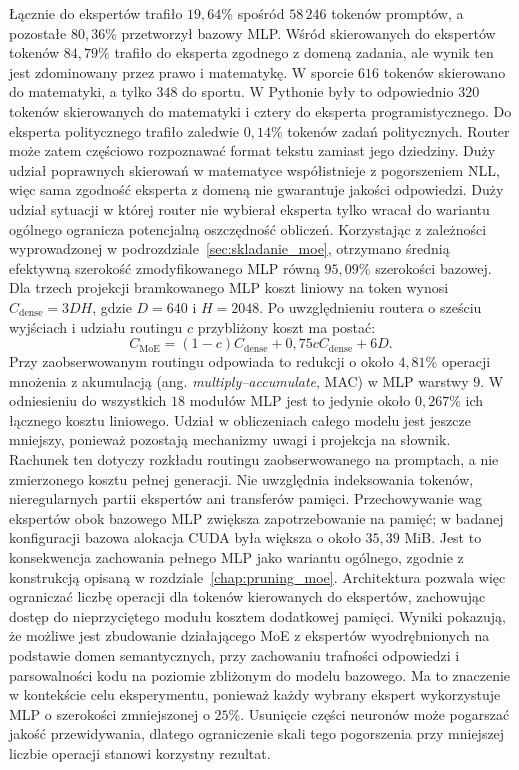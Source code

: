 Łącznie do ekspertów trafiło $19{,}64\%$ spośród $58\,246$ tokenów promptów, a pozostałe $80{,}36\%$ przetworzył bazowy MLP. Wśród skierowanych do ekspertów tokenów $84{,}79\%$ trafiło do eksperta zgodnego z domeną zadania, ale wynik ten jest zdominowany przez prawo i matematykę. W sporcie $616$ tokenów skierowano do matematyki, a tylko $348$ do sportu. W Pythonie były to odpowiednio $320$ tokenów skierowanych do matematyki i cztery do eksperta programistycznego. Do eksperta politycznego trafiło zaledwie $0{,}14\%$ tokenów zadań politycznych. Router może zatem częściowo rozpoznawać format tekstu zamiast jego dziedziny. Duży udział poprawnych skierowań w matematyce współistnieje z pogorszeniem NLL, więc sama zgodność eksperta z domeną nie gwarantuje jakości odpowiedzi. \newline
Duży udział sytuacji w której router nie wybierał eksperta tylko wracał do wariantu ogólnego ogranicza potencjalną oszczędność obliczeń. Korzystając z zależności wyprowadzonej w podrozdziale~\ref{sec:skladanie_moe}, otrzymano średnią efektywną szerokość zmodyfikowanego MLP równą $95{,}09\%$ szerokości bazowej. Dla trzech projekcji bramkowanego MLP koszt liniowy na token wynosi $C_{\mathrm{dense}}=3DH$, gdzie $D=640$ i $H=2048$. Po uwzględnieniu routera o sześciu wyjściach i udziału routingu $c$ przybliżony koszt ma postać:
\[
C_{\mathrm{MoE}}=(1-c)C_{\mathrm{dense}}+
0{,}75cC_{\mathrm{dense}}+6D.
\]
Przy zaobserwowanym routingu odpowiada to redukcji o około $4{,}81\%$ operacji mnożenia z akumulacją (ang. \textit{multiply--accumulate}, MAC) w MLP warstwy $9$. W odniesieniu do wszystkich $18$ modułów MLP jest to jedynie około $0{,}267\%$ ich łącznego kosztu liniowego. Udział w obliczeniach całego modelu jest jeszcze mniejszy, ponieważ pozostają mechanizmy uwagi i projekcja na słownik. \newline
Rachunek ten dotyczy rozkładu routingu zaobserwowanego na promptach, a nie zmierzonego kosztu pełnej generacji. Nie uwzględnia indeksowania tokenów, nieregularnych partii ekspertów ani transferów pamięci. Przechowywanie wag ekspertów obok bazowego MLP zwiększa zapotrzebowanie na pamięć; w badanej konfiguracji bazowa alokacja CUDA była większa o około $35{,}39$ MiB. Jest to konsekwencja zachowania pełnego MLP jako wariantu ogólnego, zgodnie z konstrukcją opisaną w rozdziale~\ref{chap:pruning_moe}. Architektura pozwala więc ograniczać liczbę operacji dla tokenów kierowanych do ekspertów, zachowując dostęp do nieprzyciętego modułu kosztem dodatkowej pamięci. \newline
Wyniki pokazują, że możliwe jest zbudowanie działającego MoE z ekspertów wyodrębnionych na podstawie domen semantycznych, przy zachowaniu trafności odpowiedzi i parsowalności kodu na poziomie zbliżonym do modelu bazowego. Ma to znaczenie w kontekście celu eksperymentu, ponieważ każdy wybrany ekspert wykorzystuje MLP o szerokości zmniejszonej o $25\%$. Usunięcie części neuronów może pogarszać jakość przewidywania, dlatego ograniczenie skali tego pogorszenia przy mniejszej liczbie operacji stanowi korzystny rezultat. \newline
